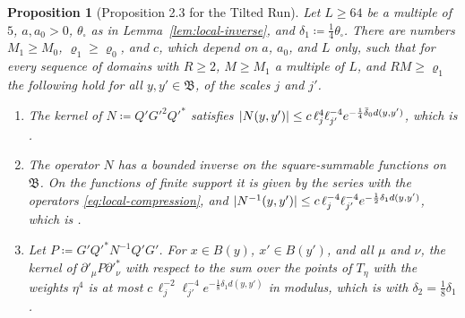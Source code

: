 \documentclass[11pt]{preprint}
\DeclarePairedDelimiter{\abs}{\lvert}{\rvert}
\numberwithin{equation}{section}
\newtheorem{proposition}[theorem]{Proposition}
\theoremstyle{definition}
\theoremstyle{remark}
\theoremstyle{plain}
\begin{document}
\begin{proposition}[Proposition 2.3 for the Tilted Run]\label{prop:sequence-inverse}
Let $L \geq 64$ be a multiple of $5$, $a, a_0 > 0$, $\theta_\square$ as in Lemma~\ref{lem:local-inverse}, and $\delta_1 \coloneqq \frac14\theta_\square$. There are numbers $M_1 \geq M_0$, $\varrho_1 \geq \varrho_0$, and $c$, which depend on $a$, $a_0$, and $L$ only, such that for every sequence of domains with $R \geq 2$, $M \geq M_1$ a multiple of $L$, and $RM \geq \varrho_1$ the following hold for all $y, y' \in \mathfrak B$, of the scales $j$ and $j'$.
\begin{enumerate}[label=(\roman*)]
\item The kernel of $N \coloneqq Q'G'^2Q'^*$ satisfies $\abs{N(y, y')} \leq c\,\ell_j^4\ell_{j'}^{-4}e^{-\frac14\bar\delta_0d(y, y')}$, which is \cite[(2.68), p.~235]{BalabanPRT2}.
\item The operator $N$ has a bounded inverse on the square-summable functions on $\mathfrak B$. On the functions of finite support it is given by the series \cite[(2.86)]{BalabanPRT2} with the operators \eqref{eq:local-compression}, and $\abs{N^{-1}(y, y')} \leq c\,\ell_j^{-4}\ell_{j'}^{-4}e^{-\frac12\delta_1d(y, y')}$, which is \cite[(2.87), p.~238]{BalabanPRT2}.
\item Let $P \coloneqq G'Q'^*N^{-1}Q'G'$. For $x \in B(y)$, $x' \in B(y')$, and all $\mu$ and $\nu$, the kernel of $\partial'_\mu P\partial'^*_\nu$ with respect to the sum over the points of $T_\eta$ with the weights $\eta^4$ is at most $c\,\ell_j^{-2}\ell_{j'}^{-4}e^{-\frac18\delta_1d(y, y')}$ in modulus, which is \cite[(2.88)]{BalabanPRT2} with $\delta_2 = \frac18\delta_1$.
\end{enumerate}
\end{proposition}
\end{document}
